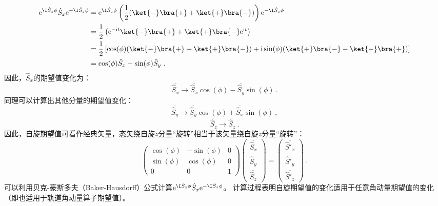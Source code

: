 \begin{equation}
\begin{aligned}
\mathrm e^{ \I\hat S_z\phi}\hat S_x\mathrm e^{- \I\hat S_z\phi}&=\mathrm e^{ \I\hat S_z\phi}\left(\frac{1}{2}(\ket{-}\bra{+}+\ket{+}\bra{-})\right)\mathrm e^{- \I\hat S_z\phi}\\
 &=\frac{1}{2}\left(\mathrm e^{-\mathrm i t}\ket{-}\bra{+}+\ket{+}\bra{-}\mathrm e^{\mathrm i t}\right)\\
 &=\frac{1}{2}\left[\cos(\phi)(\ket{-}\bra{+}+\ket{+}\bra{-})+\mathrm i\sin(\phi)(\ket{+}\bra{-}-\ket{-}\bra{+})\right]\\
 &=\cos(\phi) \hat S_x-\sin(\phi) \hat S_y~.
\end{aligned}
\end{equation}
因此，$\hat S_x$的期望值变化为：
\begin{equation}
\overline{\hat S_x}\rightarrow  \overline{\hat S_x}\cos(\phi)-\overline{\hat S_y}\sin(\phi)~.
\end{equation}
同理可以计算出其他分量的期望值变化：
\begin{equation}
\overline{\hat S_y}\rightarrow \overline{\hat S_y}\cos(\phi)+\overline{\hat S_x}\sin(\phi)~,
\end{equation}
\begin{equation}
\overline{\hat S_z}\rightarrow \overline{\hat S_z}~.
\end{equation}
因此，自旋期望值可看作经典矢量，态矢绕自旋$z$分量“旋转”相当于该矢量绕自旋$z$分量“旋转”：
\begin{equation}
\begin{pmatrix}
 \cos(\phi) &-\sin(\phi)  &0 \\
  \sin(\phi) & \cos(\phi)  & 0\\
  0& 0 &1
\end{pmatrix}
\begin{pmatrix}
 \overline{\hat S_x}\\
  \overline{\hat S_y}\\
 \overline{\hat S_z}
\end{pmatrix}
=
\begin{pmatrix}
  \overline{\hat S'_x}\\
  \overline{\hat S'_y}\\
 \overline{\hat S'_z}
\end{pmatrix}~.
\end{equation}
可以利用贝克-豪斯多夫（Baker-Hausdorff）公式计算$\mathrm e^{ \I\hat S_z\phi}\hat S_x\mathrm e^{- \I\hat S_z\phi}$。
计算过程表明自旋期望值的变化适用于任意角动量期望值的变化（即也适用于轨道角动量算子期望值）。



